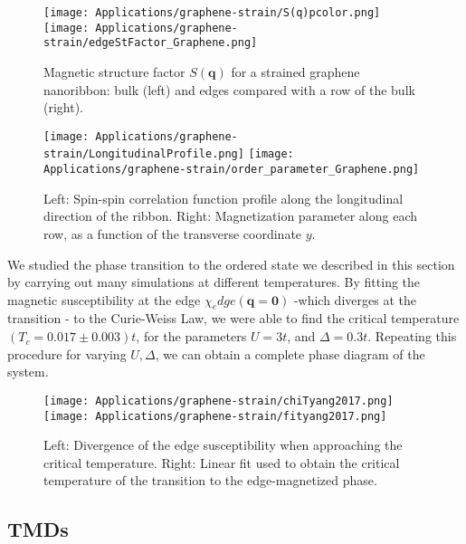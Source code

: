 \begin{figure}[H]
\texttt{[image: Applications/graphene-strain/S(q)pcolor.png]}
\hspace{-0.7cm}
\texttt{[image: Applications/graphene-strain/edgeStFactor\_Graphene.png]}
	\caption[Magnetic structure factor $S(\bm q)$ for a strained graphene nanoribbon: bulk and edges.]{Magnetic structure factor $S(\bm q)$ for a strained graphene nanoribbon: bulk (left) and edges compared with a row of the bulk (right).}
	\label{fig:edgeStFactor}
\end{figure}
\begin{figure}[H]
\texttt{[image: Applications/graphene-strain/LongitudinalProfile.png]}
\texttt{[image: Applications/graphene-strain/order\_parameter\_Graphene.png]}
	\caption[Spin-spin correlation function profile along the longitudinal direction $x$ of the ribbon. Magnetization parameter along each row, as a function of the transverse coordinate $y$.
	]{Left: Spin-spin correlation function profile along the longitudinal direction of the ribbon. Right: Magnetization parameter along each row, as a function of the transverse coordinate $y$.}
	\label{fig:longProf}
\end{figure}
We studied the phase transition to the ordered state we described in this section by carrying out many simulations at different temperatures.
By fitting the magnetic susceptibility at the edge $\chi_edge (\bm q = \bm 0)$ -which diverges at the transition - to the Curie-Weiss Law, we were able to find the critical temperature $(T_c = 0.017 \pm 0.003) t$, for the parameters $U = 3 t$, and $\Delta = 0.3 t$.
Repeating this procedure for varying $U, \Delta$, we can obtain a complete phase diagram of the system.
\begin{figure}[H]
\hspace{-0.2cm}
\texttt{[image: Applications/graphene-strain/chiTyang2017.png]}
\texttt{[image: Applications/graphene-strain/fityang2017.png]}
	\caption[Divergence of the edge susceptibility when approaching the critical temperature. Linear fit used to obtain the critical temperature of the transition to the edge-magnetized phase.]{Left: Divergence of the edge susceptibility when approaching the critical temperature. 
	Right: Linear fit used to obtain the critical temperature of the transition to the edge-magnetized phase.}
	\label{fig:chiFit}
\end{figure}

\subsection{\acp{TMD}}
\label{subsec:apTMD}

